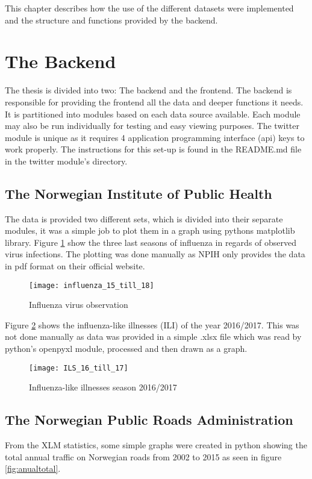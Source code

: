 This chapter describes how the use of the different datasets were implemented and the structure and functions provided by the backend.

\section{The Backend}
The thesis is divided into two: The backend and the frontend. The backend is responsible for providing the frontend all the data and deeper functions it needs. It is partitioned into modules based on each data source available. Each module may also be run individually for testing and easy viewing purposes. The twitter module is unique as it requires 4 application programming interface (api) keys to work properly. The instructions for this set-up is found in the README.md file in the twitter module's directory.


\subsection{The Norwegian Institute of Public Health}
The data is provided two different sets, which is divided into their separate modules, it was a simple job to plot them in a graph using pythons matplotlib library. Figure \ref{fig:infstat} show the three last seasons of influenza in regards of observed virus infections. The plotting was done manually as NPIH only provides the data in pdf format on their official website\cite{fhi}.

\begin{figure}[h]
\texttt{[image: influenza\_15\_till\_18]}
\centering
\caption{Influenza virus observation}
\label{fig:infstat}
\end{figure}

Figure \ref{fig:ilsstat} shows the influenza-like illnesses (ILI) of the year 2016/2017. This was not done manually as data was provided in a simple .xlsx file which was read by python's openpyxl module, processed and then drawn as a graph.

\begin{figure}[ht]
\texttt{[image: ILS\_16\_till\_17]}
\centering
\caption{Influenza-like illnesses season 2016/2017}
\label{fig:ilsstat}
\end{figure}

\newpage

\subsection{The Norwegian Public Roads Administration}
From the XLM statistics, some simple graphs were created in python showing the total annual traffic on Norwegian roads from 2002 to 2015 as seen in figure \ref{fig:anualtotal}. 

